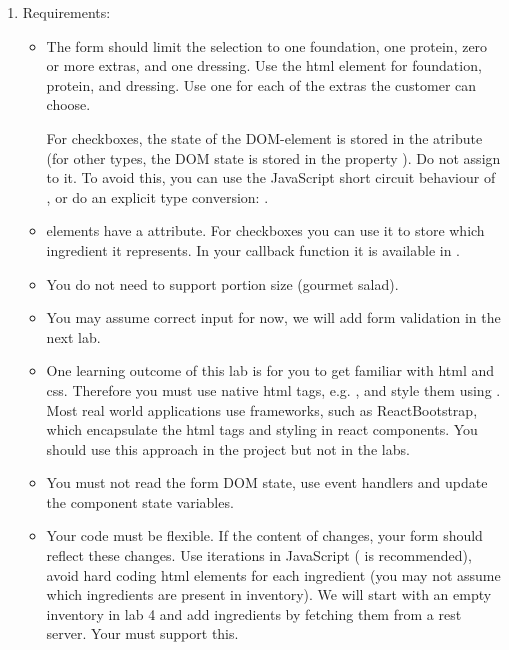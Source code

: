 \documentclass[fleqn, article, a4paper]{memoir}
\begin{document}
\begin{Assignments}
\begin{enumerate}
\item Requirements:
\begin{itemize}
  \item The form should limit the selection to one foundation, one protein, zero or more extras, and one dressing. Use the html element  for foundation, protein, and dressing. Use one  for each of the extras the customer can choose.

For checkboxes, the state of the DOM-element is stored in the atribute  (for other  types, the DOM state is stored in the property ). Do not assign  to it. To avoid this, you can use the JavaScript short circuit behaviour of \code{||} , or do an explicit type conversion: .
  \item {} elements have a  attribute. For checkboxes you can use it to store which ingredient it represents. In your callback function it is available in .

  \item You do not need to support portion size (gourmet salad).

  \item You may assume correct input for now, we will add form validation in the next lab.

  \item One learning outcome of this lab is for you to get familiar with html and css. Therefore you must use native html tags, e.g. , and style them using . Most real world applications use frameworks, such as ReactBootstrap, which encapsulate the html tags and styling in react components. You should use this approach in the project but not in the labs.
  \item You must not read the form DOM state, use event handlers and update the component state variables.
  \item Your code must be flexible. If the content of  changes, your form should reflect these changes. Use iterations in JavaScript ( is recommended), avoid hard coding html elements for each ingredient (you may not assume which ingredients are present in inventory). We will start with an empty inventory in lab 4 and add ingredients by fetching them from a rest server. Your  must support this.


\end{itemize}
\end{enumerate}
\end{Assignments}
\end{document}
